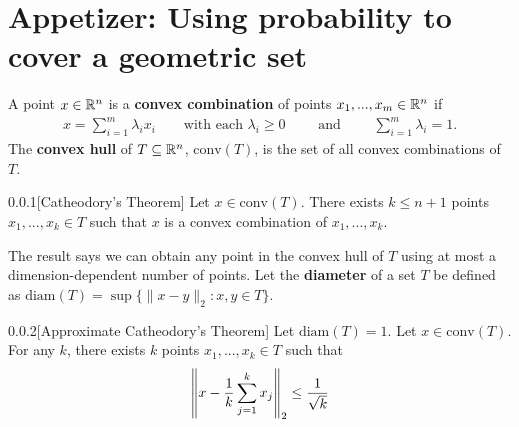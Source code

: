 

\section{Appetizer: Using probability to cover a geometric set}

A point $x \in \mathbb{R}^n$ is a \textbf{convex combination} of points $x_1,..., x_m \in \mathbb{R}^n$ if 
\begin{align*}
x = \sum_{i=1}^m \lambda_i x_i \qquad\text{with each } \lambda_i\geq0 \qquad\text{ and }\qquad \sum_{i=1}^m \lambda_i = 1.
\end{align*}
The \textbf{convex hull} of $T \subseteq \mathbb{R}^n$, $\text{conv}(T)$, is the set of all convex combinations of $T$.

\begin{thm}{0.0.1}[Catheodory's Theorem]\label{0.0.1}
Let $x \in \text{conv}(T)$. There exists $k \leq n+1$ points $x_1,...,x_k \in T$ such that $x$ is a convex combination of $x_1,...,x_k$.
\end{thm} 

The result says we can obtain any point in the convex hull of $T$ using at most a dimension-dependent number of points. Let the {\bf diameter} of a set $T$ be defined as $\text{diam}(T) = \sup \{\|x-y\|_2 : x,y \in T\}$.

\begin{thm}{0.0.2}[Approximate Catheodory's Theorem]\label{0.0.2}
Let $\text{diam}(T) = 1$. Let $x \in \text{conv}(T)$. For any $k$, there exists $k$ points $x_1,...,x_k \in T$ such that
\begin{align*}
    \left\| x - \frac 1 k \sum_{j=1}^k x_j\right\|_2 \leq \frac 1 {\sqrt k}
\end{align*}
\end{thm}

